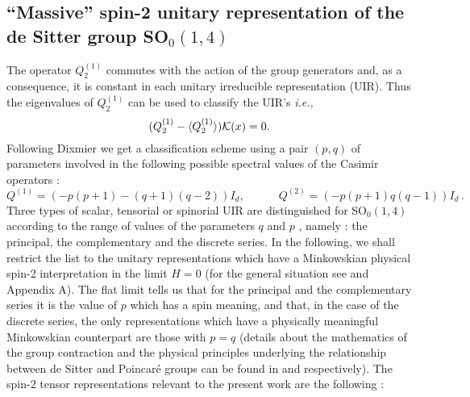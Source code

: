 \documentclass[a4paper,11pt,showpacs,preprintnumbers]{revtex4}
\begin{document}
\subsection{``Massive'' spin-2 unitary representation of the de Sitter group {SO}$_{0}(1,4)$}
The operator $Q_2^{(1)}$ commutes with the action of the group
generators and, as a consequence, it is constant in each unitary
irreducible representation (UIR). Thus the eigenvalues of
$Q_2^{(1)}$ can be used to classify the UIR's {\it i.e.,}
\begin{equation}
(Q_2^{(1)}-\langle Q_2^{(1)}\rangle){\cal K}(x)=0.
\end{equation}
Following Dixmier \cite{dix} we get a classification scheme using
a pair $(p,q)$ of parameters involved in the following possible
spectral values of the Casimir operators :
\begin{equation}
Q^{(1)}=\left(-p(p+1)-(q+1)(q-2)\right)I_d ,\qquad\quad
Q^{(2)}=\left(-p(p+1)q(q-1)\right)I_d\,.
\end{equation}
Three types of scalar, tensorial or spinorial UIR are
distinguished for SO$_{0}(1,4)$ according to the range of values
of the parameters $q$ and $p$ \cite{dix,tak}, namely : the
principal, the complementary and the discrete series. In the
following, we shall restrict  the list to the unitary
representations which have a Minkowskian physical spin-2
interpretation in the limit $H=0$ (for the general situation see
\cite{babo} and Appendix A). The flat limit tells us that for the
principal and the complementary series it is the value of $p$
which has a spin meaning, and that, in the case of the discrete
series, the only representations which have a physically
meaningful Minkowskian counterpart are those with $p=q$ (details
about the mathematics of the group contraction and the physical
principles underlying the relationship between de Sitter and
Poincar\'e groups can be found in \cite{nah} and \cite{lev}
respectively). The spin-$2$ tensor representations relevant to the
present work are the following :
\end{document}
